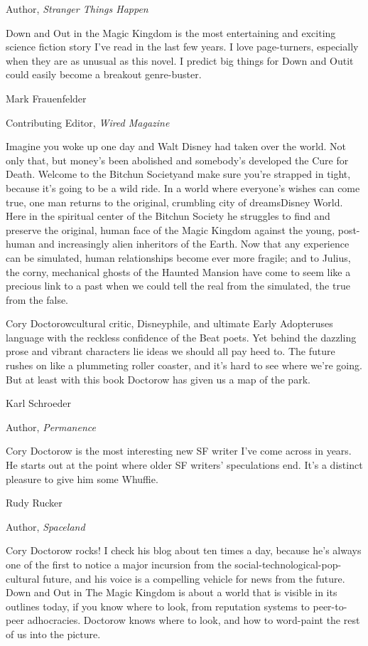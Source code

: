 Author, \emph{Stranger Things Happen}

Down and Out in the Magic Kingdom is the most entertaining and
exciting science fiction story I've read in the last few years. I
love page-turners, especially when they are as unusual as this
novel. I predict big things for Down and Out{\dash}it could easily become
a breakout genre-buster.

Mark Frauenfelder

Contributing Editor, \emph{Wired Magazine}

Imagine you woke up one day and Walt Disney had taken over the
world. Not only that, but money's been abolished and somebody's
developed the Cure for Death. Welcome to the Bitchun Society{\dash}and
make sure you're strapped in tight, because it's going to be a wild
ride. In a world where everyone's wishes can come true, one man
returns to the original, crumbling city of dreams{\dash}Disney World.
Here in the spiritual center of the Bitchun Society he struggles to
find and preserve the original, human face of the Magic Kingdom
against the young, post-human and increasingly alien inheritors of
the Earth. Now that any experience can be simulated, human
relationships become ever more fragile; and to Julius, the corny,
mechanical ghosts of the Haunted Mansion have come to seem like a
precious link to a past when we could tell the real from the
simulated, the true from the false.

Cory Doctorow{\dash}cultural critic, Disneyphile, and ultimate Early
Adopter{\dash}uses language with the reckless confidence of the Beat
poets. Yet behind the dazzling prose and vibrant characters lie
ideas we should all pay heed to. The future rushes on like a
plummeting roller coaster, and it's hard to see where we're going.
But at least with this book Doctorow has given us a map of the
park.

Karl Schroeder

Author, \emph{Permanence}

Cory Doctorow is the most interesting new SF writer I've come
across in years. He starts out at the point where older SF writers'
speculations end. It's a distinct pleasure to give him some
Whuffie.

Rudy Rucker

Author, \emph{Spaceland}

Cory Doctorow rocks! I check his blog about ten times a day,
because he's always one of the first to notice a major incursion
from the social-technological-pop-cultural future, and his voice is
a compelling vehicle for news from the future. Down and Out in The
Magic Kingdom is about a world that is visible in its outlines
today, if you know where to look, from reputation systems to
peer-to-peer adhocracies. Doctorow knows where to look, and how to
word-paint the rest of us into the picture.

